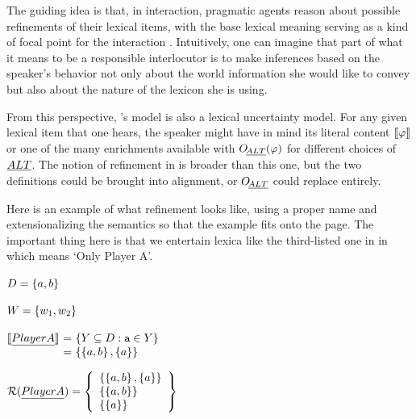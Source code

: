 \documentclass[leqno]{article}
\begin{document}
The guiding idea is that, in interaction, pragmatic agents reason
about possible refinements of their lexical items, with the base
lexical meaning serving as a kind of focal point for the interaction \citep[cf.][]{Franke09DISS}.
Intuitively, one can imagine that part of what it means to be a
responsible interlocutor is to make inferences based on the speaker's
behavior not only about the world information she would like to convey
but also about the nature of the lexicon she is using.

From this perspective, \CFS's model is also a lexical uncertainty
model. For any given lexical item that one hears, the speaker might
have in mind its literal content $\llbracket\varphi\rrbracket$ or one of the many
enrichments available with $\mathop{O\negthinspace_{\emph{ALT}}}(\varphi)$ for different choices
of $\emph{ALT}$. The notion of refinement in  is broader than
this one, but the two definitions could be brought into alignment, or
$\mathop{O\negthinspace_{\emph{ALT}}}$ could replace  entirely.

Here is an example of what refinement looks like, using a proper name
and extensionalizing the semantics so that the example fits onto the
page.  The important thing here is that we entertain lexica like the
third-listed one in  in which
 means `Only Player A'.

\begin{examples}
\item\label{refinement-ex}
  
  \begin{examples}
  \item $D = \left\{ a,b \right\}$
  \item $W = \left\{ w_{1}, w_{2} \right\}$
  \item  $\begin{array}[t]{@{} r@{ \ = \ }l}
            \sem{\word{Player A}} 
            & \set{Y \subseteq D : \playera \in Y} \\
            & \set{ \set{a,b}, \set{a} }
          \end{array}$  
   \item\label{ex-refinements} 
     $\mathcal{R}(\emph{Player A}) = 
     \left\{ 
       \begin{array}[c]{l}
         \left\{ \left\{ a,b \right\}, \left\{ a \right\} \right\}  \\
         \left\{ \left\{ a,b \right\} \right\} \\
         \left\{ \left\{ a \right\} \right\} \\
       \end{array}
      \right\}$
  \end{examples}
\end{examples}
\end{document}
